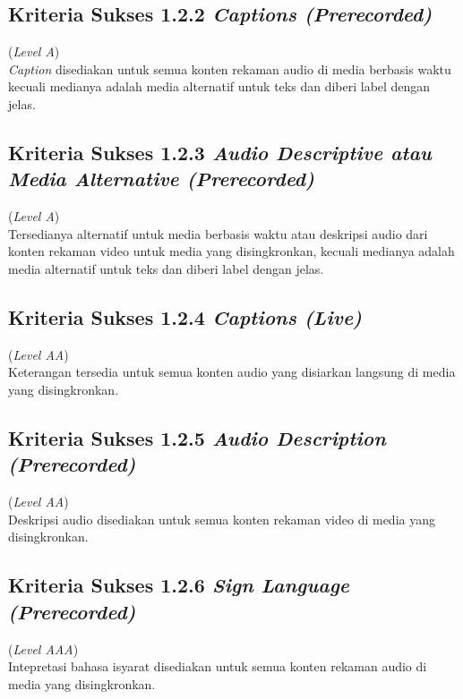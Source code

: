\subsection{Kriteria Sukses 1.2.2 \textit{Captions (Prerecorded)}}
\label{subsec:kriteria_1.2.2}
(\textit{Level A}) \\

\textit{Caption} disediakan untuk semua konten rekaman audio di media berbasis waktu kecuali medianya adalah media alternatif untuk teks dan diberi label dengan jelas.


\subsection{Kriteria Sukses 1.2.3 \textit{Audio Descriptive atau Media Alternative (Prerecorded)}}
\label{subsec:kriteria_1.2.3}
(\textit{Level A}) \\

Tersedianya alternatif untuk media berbasis waktu atau deskripsi audio dari konten rekaman video untuk media yang disingkronkan, kecuali medianya adalah media alternatif untuk teks dan diberi label dengan jelas.


\subsection{Kriteria Sukses 1.2.4 \textit{Captions (Live)}}
\label{subsec:kriteria_1.2.4}
(\textit{Level AA}) \\

Keterangan tersedia untuk semua konten audio yang disiarkan langsung di media yang disingkronkan.


\subsection{Kriteria Sukses 1.2.5 \textit{Audio Description (Prerecorded)}}
\label{subsec:kriteria_1.2.5}
(\textit{Level AA}) \\

Deskripsi audio disediakan untuk semua konten rekaman video di media yang disingkronkan.


\subsection{Kriteria Sukses 1.2.6 \textit{Sign Language (Prerecorded)}}
\label{subsec:kriteria_1.2.6}
(\textit{Level AAA}) \\

Intepretasi bahasa isyarat disediakan untuk semua konten rekaman audio di media yang disingkronkan.


